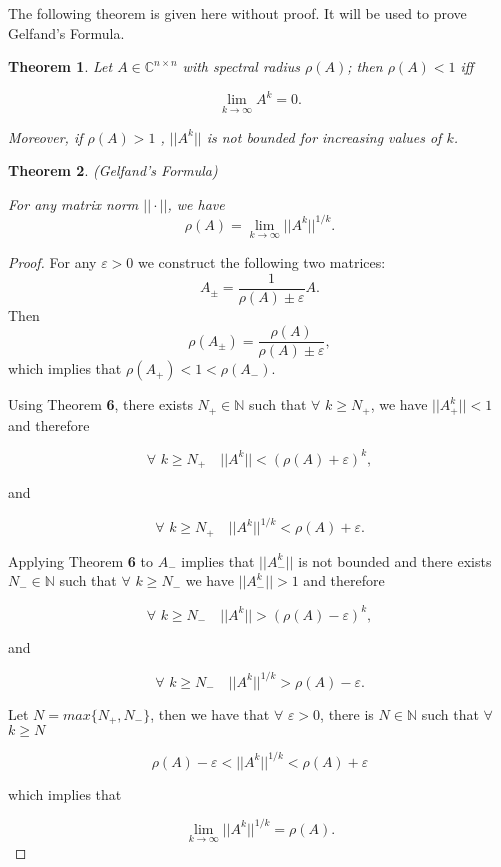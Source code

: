 \documentclass[12pt]{article}
\newtheorem{theorem}{Theorem}
\begin{document}
\vspace*{1em}

The following theorem is given here without proof. It will be used to prove 
Gelfand's Formula.

\begin{theorem}
Let $A\in \mathbb{C}^{n\times n}$ with spectral radius $\rho(A)$; then
$\rho(A)<1$ iff

\[
\lim_{k\rightarrow\infty} A^k = 0.
\]

Moreover, if $\rho(A)>1$ , $||A^k||$ is not bounded for increasing values of
$k$.
\end{theorem}

\begin{theorem}
(Gelfand's Formula)

For any matrix norm $||\cdot||$, we have
\[
\rho(A) = \lim_{k\rightarrow\infty} ||A^k||^{1/k}.
\]
\end{theorem}
\begin{proof}
For any $\varepsilon>0$ we construct the following two matrices:
\[
A_{\pm} = \frac{1}{\rho(A)\pm\varepsilon}A.
\]
Then
\[
\rho(A_{\pm}) = \frac{\rho(A)}{\rho(A)\pm\varepsilon},
\]
which implies that $\rho(A_+) < 1 < \rho(A_-)$.

Using Theorem \textbf{6}, there exists $N_+ \in \mathbb{N}$ such that $\forall$
$k\geq N_+$, we have $||A_+^k|| <1$ and therefore

\[
\forall\,\, k \geq N_+ \quad ||A^k|| < (\rho(A)+\varepsilon)^k,
\]

and

\[
\forall\,\, k \geq N_+ \quad ||A^k||^{1/k} < \rho(A)+\varepsilon.
\]

Applying Theorem \textbf{6} to $A_-$ implies that $||A_-^k||$ is not bounded 
and there exists $N_- \in \mathbb{N}$ such that $\forall$ $k\geq N_-$ we have
$||A_-^k|| >1$ and therefore 

\[
\forall\,\, k \geq N_- \quad ||A^k|| > (\rho(A)-\varepsilon)^k,
\]

and

\[
\forall\,\, k \geq N_- \quad ||A^k||^{1/k} > \rho(A)-\varepsilon.
\]

Let $N = max\{N_+,N_-\}$, then we have that $\forall$ $\varepsilon>0$, there 
is $N\in\mathbb{N}$ such that $\forall$ $k\geq N$

\[
\rho(A)-\varepsilon < ||A^k||^{1/k} < \rho(A) + \varepsilon
\]

which implies that

\[
\lim_{k\rightarrow\infty}||A^k||^{1/k} = \rho(A).
\]
\end{proof}
\end{document}
